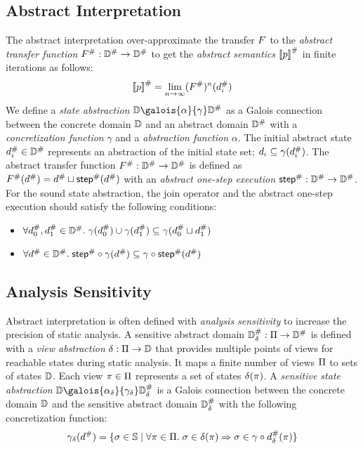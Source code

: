 \subsection{Abstract Interpretation}
The abstract interpretation over-approximate the transfer $F$ to the
\textit{abstract transfer function} ${F}^{\#}: {\mathbb{D}}^{\#} \rightarrow {\mathbb{D}}^{\#}$
to get the \textit{abstract semantics} ${[\![{p}]\!]}^{\#}$ in finite iterations as
follows:
\[
    {[\![{p}]\!]}^{\#} = \underset{n \rightarrow
    \infty}{\lim}{({F}^{\#})^n({d}^{\#}_\iota)}\\
\]
We define a \textit{state abstraction} $\dom \galois{\alpha}{\gamma} \absdom$ as
a Galois connection between the concrete domain $\mathbb{D}$ and an abstract domain
${\mathbb{D}}^{\#}$ with a \textit{concretization function} $\gamma$ and a
\textit{abstraction function} $\alpha$.  The initial abstract state ${d}^{\#}_\iota
\in {\mathbb{D}}^{\#}$ represents an abstraction of the initial state set; $d_\iota
\subseteq \gamma({d}^{\#}_\iota)$.  The abstract transfer function ${F}^{\#}:
{\mathbb{D}}^{\#} \rightarrow {\mathbb{D}}^{\#}$ is defined as ${F}^{\#}({d}^{\#}) = {d}^{\#}
\sqcup {\textsf{step}}^{\#}({d}^{\#})$ with an \textit{abstract one-step execution}
${\textsf{step}}^{\#}: {\mathbb{D}}^{\#} \rightarrow {\mathbb{D}}^{\#}$.  For the sound state abstraction, the
join operator and the abstract one-step execution should satisfy the following
conditions:
\begin{itemize}
  \item $\forall {d}^{\#}_0, {d}^{\#}_1 \in {\mathbb{D}}^{\#}. \; \gamma({d}^{\#}_0) \cup
    \gamma({d}^{\#}_1) \subseteq \gamma({d}^{\#}_0 \sqcup {d}^{\#}_1)$
  \item $\forall {d}^{\#} \in {\mathbb{D}}^{\#}. \; {\textsf{step}}^{\#} \circ \gamma({d}^{\#}) \subseteq
    \gamma \circ {\textsf{step}}^{\#}({d}^{\#})$
\end{itemize}


\subsection{Analysis Sensitivity}

Abstract interpretation is often defined with \textit{analysis sensitivity} to
increase the precision of static analysis.  A sensitive abstract domain
${\mathbb{D}}^{\#}_\delta: \Pi \rightarrow {\mathbb{D}}^{\#}$ is defined with a \textit{view
abstraction} $\delta: \Pi \rightarrow \mathbb{D}$ that provides multiple points
of views for reachable states during static analysis.  It maps a finite number
of views $\Pi$ to sets of states $\mathbb{D}$. Each view $\pi \in \Pi$
represents a set of states $\delta(\pi)$.
A \textit{sensitive state abstraction} $\dom
\galois{\alpha_\viewmap}{\gamma_\viewmap} \sabsdom$ is a Galois connection between
the concrete domain $\mathbb{D}$ and the sensitive abstract domain ${\mathbb{D}}^{\#}_\delta$ with the
following concretization function:
\[
  \gamma_\delta({d}^{\#}) = \{ \sigma \in \mathbb{S} \mid \forall \pi \in \Pi.
  \; \sigma \in \delta(\pi) \Rightarrow \sigma \in \gamma \circ {d}^{\#}_\delta(\pi) \}
\]

